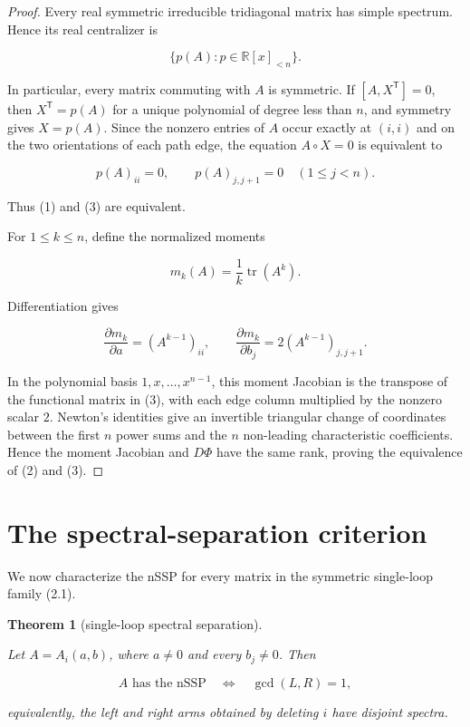 \documentclass[11pt]{article}
\newtheorem{theorem}{Theorem}[section]
\theoremstyle{remark}
\begin{document}
\begin{proof}

Every real symmetric irreducible tridiagonal matrix has simple spectrum. Hence its real centralizer is

\[
  \{p(A):p\in\mathbb R[x]_{<n}\}.
\]

In particular, every matrix commuting with $A$ is symmetric. If
$[A,X^{\mathsf T}]=0$, then $X^{\mathsf T}=p(A)$ for a unique polynomial of degree less than
$n$, and symmetry gives $X=p(A)$. Since the nonzero entries of $A$ occur exactly at $(i,i)$
and on the two orientations of each path edge, the equation $A\circ X=0$ is equivalent to

\[
  p(A)_{ii}=0,\qquad p(A)_{j,j+1}=0\quad(1\leq j<n).
\]

Thus (1) and (3) are equivalent.

For $1\leq k\leq n$, define the normalized moments

\[
  m_k(A)=\frac1k\operatorname{tr}(A^k).
\]

Differentiation gives

\[
  \frac{\partial m_k}{\partial a}=(A^{k-1})_{ii},
  \qquad
  \frac{\partial m_k}{\partial b_j}=2(A^{k-1})_{j,j+1}. \tag{3.1}
\]

In the polynomial basis $1,x,\ldots,x^{n-1}$, this moment Jacobian is the transpose of the
functional matrix in (3), with each edge column multiplied by the nonzero scalar $2$. Newton's
identities give an invertible triangular change of coordinates between the first $n$ power sums and
the $n$ non-leading characteristic coefficients. Hence the moment Jacobian and $D\Phi$ have the
same rank, proving the equivalence of (2) and (3). \qedhere

\end{proof}

\section{The spectral-separation criterion}


We now characterize the nSSP for every matrix in the symmetric single-loop family (2.1).

\begin{theorem}[single-loop spectral separation]
\label{theorem:4-1}

Let $A=A_i(a,b)$, where $a\neq0$ and every $b_j\neq0$. Then

\[
  A\text{ has the nSSP}
  \quad\Longleftrightarrow\quad
  \gcd(L,R)=1,
\]

equivalently, the left and right arms obtained by deleting $i$ have disjoint spectra.

\end{theorem}
\end{document}
